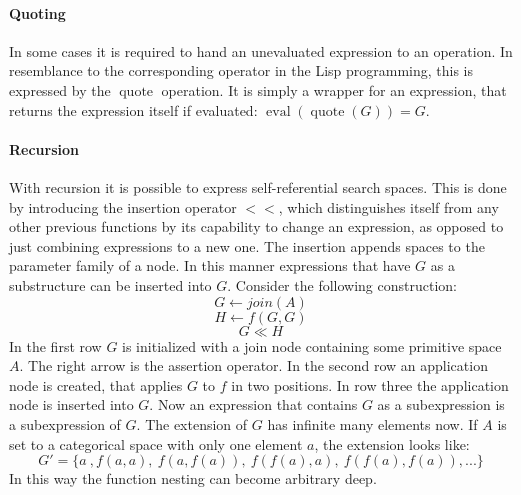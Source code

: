 \documentclass[english]{article}
\newcommand{\eval}{\operatorname{eval}}
\newcommand{\quot}{\operatorname{quote}}
\begin{document}
\paragraph{Quoting}
In some cases it is required to hand an unevaluated expression to an operation. In resemblance to the corresponding operator in the Lisp programming, this is expressed by the $\operatorname{quote}$ operation. It is simply a wrapper for an expression, that returns the expression itself if evaluated: $\eval(\quot(G)) = G$.

\paragraph{Recursion}
With recursion it is possible to express self-referential search spaces. This is done by introducing the insertion operator $<<$, which distinguishes itself from any other previous functions by its capability to change an expression, as opposed to just combining expressions to a new one. The insertion appends spaces to the parameter family of a node. In this manner expressions that have $G$ as a substructure can be inserted into $G$. Consider the following construction:
$$G \leftarrow join(A)$$
$$H \leftarrow f(G, G)$$
$$ G  \ll H$$
In the first row $G$ is initialized with a join node containing some primitive space $A$. The right arrow is the assertion operator. In the second row an application node is created, that applies $G$ to $f$ in two positions. In row three the application node is inserted into $G$. Now an expression that contains $G$ as a subexpression is a subexpression of $G$.
The extension of $G$ has infinite many elements now. If $A$ is set to a categorical space with only one element $a$, the extension looks like:
$$ G' = \{a\ ,f(a,a),\ f(a,f(a)),\ f(f(a),a),\ f(f(a),f(a)), ...\}$$
In this way the function nesting can become arbitrary deep.
\end{document}
